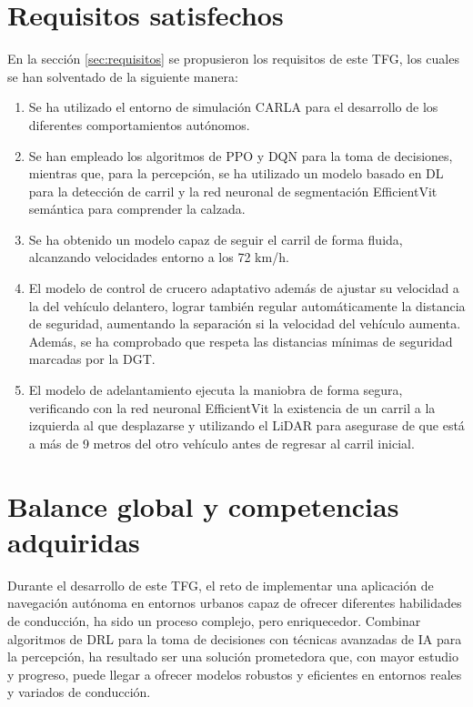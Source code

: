 \section{Requisitos satisfechos}

En la sección \ref{sec:requisitos} se propusieron los requisitos de este \ac{TFG}, los cuales se han solventado de la siguiente manera:

\begin{enumerate}
\item Se ha utilizado el entorno de simulación CARLA para el desarrollo de los diferentes comportamientos autónomos.
\item Se han empleado los algoritmos de \ac{PPO} y \ac{DQN} para la toma de decisiones, mientras que, para la percepción, se ha utilizado un modelo basado en \ac{DL} para la detección de carril y la red neuronal de segmentación EfficientVit semántica para comprender la calzada.
\item Se ha obtenido un modelo capaz de seguir el carril de forma fluida, alcanzando velocidades entorno a los 72 km/h.
\item El modelo de control de crucero adaptativo además de ajustar su velocidad a la del vehículo delantero, lograr también regular automáticamente la distancia de seguridad, aumentando la separación si la velocidad del vehículo aumenta. Además, se ha comprobado que respeta las distancias mínimas de seguridad marcadas por la \ac{DGT}.
\item El modelo de adelantamiento ejecuta la maniobra de forma segura, verificando con la red neuronal EfficientVit la existencia de un carril a la izquierda al que desplazarse y utilizando el \ac{LiDAR} para asegurase de que está a más de 9 metros del otro vehículo antes de regresar al carril inicial.
\end{enumerate}

\section{Balance global y competencias adquiridas}

Durante el desarrollo de este \ac{TFG}, el reto de implementar una aplicación de navegación autónoma en entornos urbanos capaz de ofrecer diferentes habilidades de conducción, ha sido un proceso complejo, pero enriquecedor. Combinar algoritmos de \ac{DRL} para la toma de decisiones con técnicas avanzadas de \ac{IA} para la percepción, ha resultado ser una solución prometedora que, con mayor estudio y progreso, puede llegar a ofrecer modelos robustos y eficientes en entornos reales y variados de conducción.


